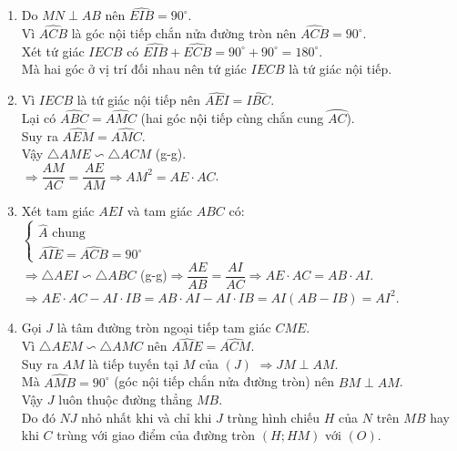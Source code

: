 \begin{ex}
{\begin{center}
	\end{center}
	\begin{enumerate}
		\item Do $MN\perp AB$ nên $\widehat{EIB}=90^\circ$.\\
		Vì $\widehat{ACB}$ là góc nội tiếp chắn nửa đường tròn nên $\widehat{ACB}=90^\circ$.\\
		Xét tứ giác $IECB$ có $\widehat{EIB}+\widehat{ECB}=90^\circ+90^\circ=180^\circ$.\\
		Mà hai góc ở vị trí đối nhau nên tứ giác $IECB$ là tứ giác nội tiếp.
		\item Vì $IECB$ là tứ giác nội tiếp nên $\widehat{AEI}=\widehat{IBC}$.\\
		Lại có $\widehat{ABC}=\widehat{AMC}$ (hai góc nội tiếp cùng chắn cung $\wideparen{AC}$).\\
		Suy ra $\widehat{AEM}=\widehat{AMC}$.\\
		Vậy $\triangle AME\backsim\triangle ACM$ (g-g).\\
		$\Rightarrow \dfrac{AM}{AC}=\dfrac{AE}{AM} \Rightarrow AM^2=AE\cdot AC$.
		\item Xét tam giác $AEI$ và tam giác $ABC$ có:\\
		$\begin{cases}
		\widehat{A}\text{ chung} \\ \widehat{AIE}=\widehat{ACB}=90^\circ
		\end{cases}$\\
		$\Rightarrow \triangle AEI\backsim\triangle ABC$ (g-g)$\Rightarrow \dfrac{AE}{AB}=\dfrac{AI}{AC}\Rightarrow AE\cdot AC=AB\cdot AI$.\\
		$\Rightarrow AE\cdot AC-AI\cdot IB=AB\cdot AI-AI\cdot IB=AI(AB-IB)=AI^2$.
		\item Gọi $J$ là tâm đường tròn ngoại tiếp tam giác $CME$.\\
		Vì $\triangle AEM\backsim\triangle AMC$ nên $\widehat{AME}=\widehat{ACM}$.\\
		Suy ra $AM$ là tiếp tuyến tại $M$ của $(J)$ $\Rightarrow JM\perp AM$.\\
		Mà $\widehat{AMB}=90^\circ$ (góc nội tiếp chắn nửa đường tròn) nên $BM\perp AM$.\\
		Vậy $J$ luôn thuộc đường thẳng $MB$.\\
		Do đó $NJ$ nhỏ nhất khi và chỉ khi $J$ trùng hình chiếu $H$ của $N$ trên $MB$ hay khi $C$ trùng với giao điểm của đường tròn $(H;HM)$ với $(O)$.
	\end{enumerate}	
	}
\end{ex}
